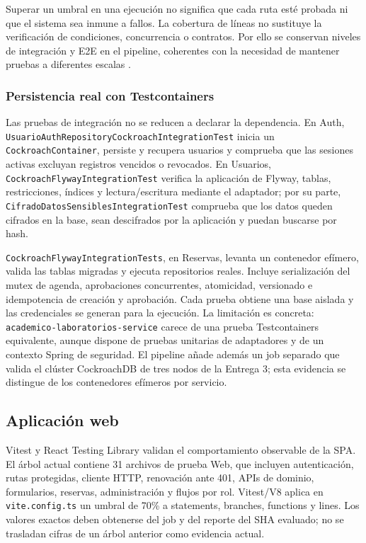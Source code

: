 Superar un umbral en una ejecución no significa que cada ruta esté probada ni
que el sistema sea inmune a fallos. La cobertura de líneas no sustituye la
verificación de condiciones,
concurrencia o contratos. Por ello se conservan niveles de integración y E2E en
el pipeline, coherentes con la necesidad de mantener pruebas a diferentes
escalas \cite{winters2020softwareengineeringgoogle}.

\subsubsection{Persistencia real con Testcontainers}

Las pruebas de integración no se reducen a declarar la dependencia. En Auth,
\texttt{UsuarioAuthRepositoryCockroachIntegrationTest} inicia un
\texttt{CockroachContainer}, persiste y recupera usuarios y comprueba que las
sesiones activas excluyan registros vencidos o revocados. En Usuarios,
\texttt{CockroachFlywayIntegrationTest} verifica la aplicación de Flyway,
tablas, restricciones, índices y lectura/escritura mediante el adaptador; por
su parte, \texttt{CifradoDatosSensiblesIntegrationTest} comprueba que los datos
queden cifrados en la base, sean descifrados por la aplicación y puedan buscarse
por hash.

\texttt{CockroachFlywayIntegrationTests}, en Reservas, levanta un contenedor
efímero, valida las tablas migradas y ejecuta repositorios reales. Incluye
serialización del mutex de agenda, aprobaciones concurrentes, atomicidad,
versionado e idempotencia de creación y aprobación. Cada prueba obtiene una base
aislada y las credenciales se generan para la ejecución. La limitación es
concreta: \texttt{academico-laboratorios-service} carece de una prueba
Testcontainers equivalente, aunque dispone de pruebas unitarias de adaptadores y
de un contexto Spring de seguridad. El pipeline añade además un job separado que
valida el clúster CockroachDB de tres nodos de la Entrega 3; esta evidencia se
distingue de los contenedores efímeros por servicio.

\subsection{Aplicación web}
\label{subsec:pruebas-web}

Vitest y React Testing Library validan el comportamiento observable de la SPA.
El árbol actual contiene 31 archivos de prueba Web, que incluyen autenticación,
rutas protegidas, cliente HTTP, renovación ante 401, APIs de dominio,
formularios, reservas, administración y flujos por rol. Vitest/V8 aplica en
\texttt{vite.config.ts} un umbral de 70\% a statements, branches, functions y
lines. Los valores exactos deben obtenerse del job y del reporte del SHA
evaluado; no se trasladan cifras de un árbol anterior como evidencia actual.

